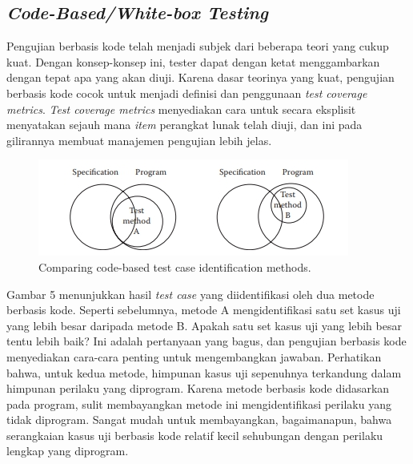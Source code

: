 \documentclass[a4paper,twoside]{article}
\begin{document}
\begin{enumerate}
\subsection*{\textit{Code-Based/White-box Testing}}
Pengujian berbasis kode telah menjadi subjek dari beberapa teori yang cukup kuat. Dengan konsep-konsep ini, tester dapat dengan ketat menggambarkan dengan tepat apa yang akan diuji. Karena dasar teorinya yang kuat, pengujian berbasis kode cocok untuk menjadi definisi dan penggunaan \textit{test coverage metrics}. \textit{Test coverage metrics} menyediakan cara untuk secara eksplisit menyatakan sejauh mana \textit{item} perangkat lunak telah diuji, dan ini pada gilirannya membuat manajemen pengujian lebih jelas.
\begin{figure}[h!]
 \includegraphics[scale=1.2]{../DokumenSkripsi/gambar/compareAB-whitebox}
 \centering
 \caption{Comparing code-based test case identification methods.}
\end{figure}
Gambar 5 menunjukkan hasil \textit{test case} yang diidentifikasi oleh dua metode berbasis kode. Seperti sebelumnya, metode A mengidentifikasi satu set kasus uji yang lebih besar daripada metode B. Apakah satu set kasus uji yang lebih besar tentu lebih baik? Ini adalah pertanyaan yang bagus, dan pengujian berbasis kode menyediakan cara-cara penting untuk mengembangkan jawaban. Perhatikan bahwa, untuk kedua metode, himpunan kasus uji sepenuhnya terkandung dalam himpunan perilaku yang diprogram. Karena metode berbasis kode didasarkan pada program, sulit membayangkan metode ini mengidentifikasi perilaku yang tidak diprogram. Sangat mudah untuk membayangkan, bagaimanapun, bahwa serangkaian kasus uji berbasis kode relatif kecil sehubungan dengan perilaku lengkap yang diprogram. 


\end{enumerate}
\end{document}
